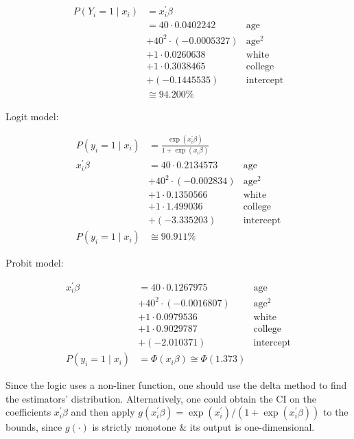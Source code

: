 {{\begin{enumerate}[label=(\alph*)]
{$$
\begin{aligned}
P\left(Y_{i}=1 \mid x_{i}\right) & =x_{i}^\prime \beta &\\
& =40 \cdot 0.0402242 &  \text{age} \\
& +40^{2} \cdot(-0.0005327) &  \text{age}^2 \\
& +1 \cdot 0.0260638 &  \text{white} \\
& +1 \cdot 0.3038465 &  \text{college} \\
& +(-0.1445535) & \text{intercept} \\
& \cong 94.200 \% & 
\end{aligned}
$$

Logit model:

$$
\begin{aligned}
P\left(y_{i}=1 \mid x_{i}\right) & =\frac{\exp \left(x_{i}^{\prime} \beta\right)}{1+\exp \left(x_{i} \beta\right)} &\\
x_{i}^{\prime} \beta & =40 \cdot 0.2134573&  \text{age} \\
& +40^{2} \cdot(-0.002834) &  \text{age}^2 \\
& +1 \cdot 0.1350566 &  \text{white} \\
& +1 \cdot 1.499036 &  \text{college} \\
& +(-3.335203) & \text{intercept} \\
P\left(y_{i}=1 \mid x_{i}\right) & \cong 90.911 \% &
\end{aligned}
$$

Probit model:

$$
\begin{aligned}
x_{i}^{\prime} \beta & =40 \cdot 0.1267975&  \text{age} \\
& +40^{2} \cdot(-0.0016807) &  \text{age}^2 \\
& +1 \cdot 0.0979536 &  \text{white} \\
& +1 \cdot 0.9029787 &  \text{college} \\
& +(-2.010371) & \text{intercept} \\
P\left(y_{i}=1 \mid x_{i}\right) & =\Phi\left(x_{i} \beta\right) \cong \Phi(1.373) &
\end{aligned}
$$
}
{\item 
Since the logic uses a non-liner function, one should use the delta method to find the estimators' distribution. Alternatively, one could obtain the CI on the coefficients $x_{i}^{\prime} \beta$ and then apply $g\left(x_{i}^{\prime} \beta\right)=\exp \left(x_{i}^{\prime}\right) /\left(1+\exp \left(x_{i}^{\prime} \beta\right)\right)$ to the bounds, since $g(\cdot)$ is strictly monotone \& its output is one-dimensional.
}
\end{enumerate}
}
{
}}
